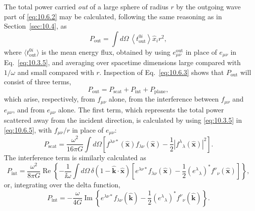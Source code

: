 The total power carried \emph{out} of a large sphere of radius \(r\) by the
outgoing wave part of \eqref{eq:10.6.2} may be calculated, following the
same reasoning as in Section~\ref{sec:10.4}, as
\begin{equation}
  P_{\mathrm{out}}
  =
  \int d\Omega\,
  \left\langle t_{\mathrm{out}}^{0i}\right\rangle
  \widehat x_i r^2,
  \tag{10.6.5}\label{eq:10.6.5}
\end{equation}
where \(\langle t_{\mathrm{out}}^{0i}\rangle\) is the mean energy flux, obtained
by using \(e^{\mathrm{out}}_{\mu\nu}\) in place of \(e_{\mu\nu}\) in
Eq.~\eqref{eq:10.3.5}, and averaging over spacetime dimensions large
compared with \(1/\omega\) and small compared with \(r\). Inspection of
Eq.~\eqref{eq:10.6.3} shows that \(P_{\mathrm{out}}\) will consist of three
terms,
\begin{equation}
  P_{\mathrm{out}}
  =
  P_{\mathrm{scat}}+P_{\mathrm{int}}+P_{\mathrm{plane}},
  \tag{10.6.6}\label{eq:10.6.6}
\end{equation}
which arise, respectively, from \(f_{\mu\nu}\) alone, from the interference
between \(f_{\mu\nu}\) and \(e_{\mu\nu}\), and from \(e_{\mu\nu}\) alone.
The first term, which represents the total power scattered away from the
incident direction, is calculated by using \eqref{eq:10.3.5} in
\eqref{eq:10.6.5}, with \(f_{\mu\nu}/r\) in place of \(e_{\mu\nu}\):
\begin{equation}
  P_{\mathrm{scat}}
  =
  \frac{\omega^2}{16\pi G}
  \int d\Omega
  \left[
    f^{\lambda\nu*}(\widehat{\mathbf{x}})
    f_{\lambda\nu}(\widehat{\mathbf{x}})
    -\frac12
    \left|f^\lambda{}_\lambda(\widehat{\mathbf{x}})\right|^2
  \right].
  \tag{10.6.7}\label{eq:10.6.7}
\end{equation}
The interference term is similarly calculated as
\[
  P_{\mathrm{int}}
  =
  \frac{\omega^2}{8\pi G}
  \operatorname{Re}\!\left\{
    -\frac{1}{\ii\omega}
    \int d\Omega\,
    \delta(1-\widehat{\mathbf{k}}\cdot\widehat{\mathbf{x}})
    \left[
      e^{\lambda\nu*}f_{\lambda\nu}(\widehat{\mathbf{x}})
      -\frac12(e^\lambda{}_\lambda)^*
      f^\nu{}_\nu(\widehat{\mathbf{x}})
    \right]
  \right\},
\]
or, integrating over the delta function,
\begin{equation}
  P_{\mathrm{int}}
  =
  -\frac{\omega}{4G}
  \operatorname{Im}\!\left\{
    e^{\lambda\nu*}f_{\lambda\nu}(\widehat{\mathbf{k}})
    -\frac12(e^\lambda{}_\lambda)^*
    f^\nu{}_\nu(\widehat{\mathbf{k}})
  \right\}.
  \tag{10.6.8}\label{eq:10.6.8}
\end{equation}
